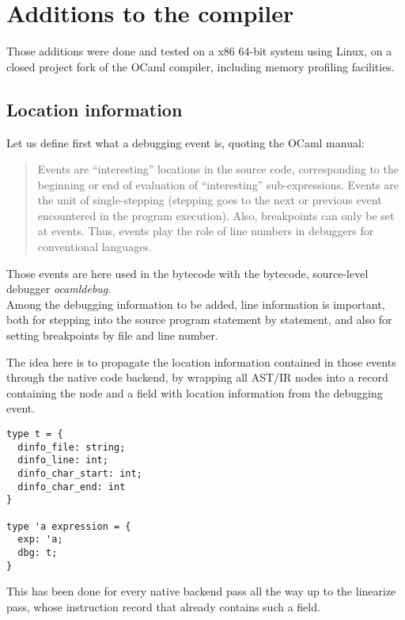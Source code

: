 

\section{Additions to the compiler}

Those additions were done and tested on a x86 64-bit system using Linux, on a
closed project fork of the OCaml compiler, including memory profiling
facilities.

\subsection{Location information}

Let us define first what a debugging event is, quoting the OCaml manual:

\begin{quotation}
    Events are “interesting” locations in the source code, corresponding to the
    beginning or end of evaluation of “interesting” sub-expressions. Events are
    the unit of single-stepping (stepping goes to the next or previous event
    encountered in the program execution). Also, breakpoints can only be set at
    events. Thus, events play the role of line numbers in debuggers for
    conventional languages. \autocite{events}
\end{quotation}

Those events are here used in the bytecode with the bytecode, source-level
debugger \textit{ocamldebug}. \\

Among the debugging information to be added, line information is important,
both for stepping into the source program statement by statement,
and also for setting breakpoints by file and line number.

The idea here is to propagate the location information contained in those events
through the native code backend, by wrapping all AST/IR nodes into a record
containing the node and a field with location information from the debugging
event.

\begin{lstlisting}
type t = {
  dinfo_file: string;
  dinfo_line: int;
  dinfo_char_start: int;
  dinfo_char_end: int
}

type 'a expression = {
  exp: 'a;
  dbg: t;
}
\end{lstlisting}

This has been done for every native backend pass all the way up to the linearize
pass, whose instruction record that already contains such a field.


